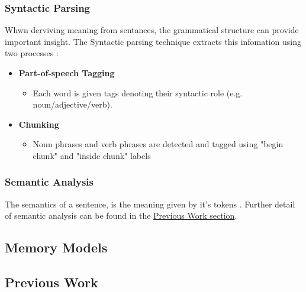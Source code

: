 \documentclass[twocolumn]{article}
\begin{document}
\subsubsection{Syntactic Parsing}
\label{sec:SyntacticParsing}
Whwn derviving meaning from sentances, the grammatical structure can provide important insight. The Syntactic parsing technique extracts this infomation using two processes \cite{NLPAlmostFromScratch}: 
\begin{itemize}
	\item \textbf{Part-of-speech Tagging}
	
	\begin{itemize}
		\item Each word is given tags denoting their syntactic role (e.g. noun/adjective/verb).
	\end{itemize}		
	
	\item \textbf{Chunking}
	
	\begin{itemize}
		\item Noun phrases and verb phrases are detected and tagged using "begin chunk" and "inside chunk" labels
	\end{itemize}	
	
\end{itemize}

\subsubsection{Semantic Analysis}
\label{sec:SemanticAnalysis}
The semantics of a sentence, is the meaning given by it's tokens \cite{SemanticAnalysisAPracticalIntro}. Further detail of semantic analysis can be found in the \hyperref[sec:PrevWork]{Previous Work section}.

\subsection{Memory Models}
\label{sec:MemModels}

\subsection{Previous Work}
\label{sec:PrevWork}


\newpage


\end{document}

